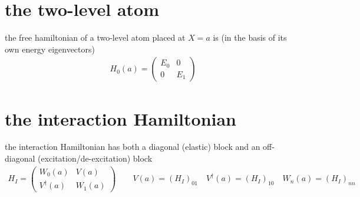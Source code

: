 \section{the two-level atom}\label{sect:tls-two-level-atom}

the free hamiltonian of a two-level atom placed at $X=a$ is (in the basis of its own energy eigenvectors)
\begin{align}
    H_0(a) = \left(
        \begin{array}{cc}E_0&0\\0&E_1
    \end{array}\right)
\end{align}

\section{the interaction Hamiltonian}\label{sec:tls-interaction}
the interaction Hamiltonian has both a diagonal (elastic) block and an off-diagonal (excitation/de-excitation) block
\begin{align}
    H_I = \left(
        \begin{array}{cc}W_0(a)&V(a)\\V^\dag(a)&W_1(a)
    \end{array}\right)\qquad V(a) = (H_I)_{01}\quad V^\dag(a) = (H_I)_{10}\quad W_n(a) = (H_I)_{nn}
\end{align}

